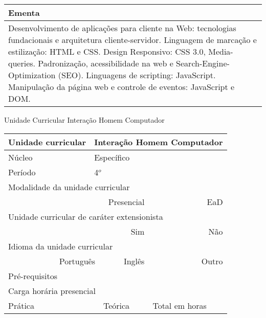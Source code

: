 \begin{quadro}[ht!]
\begin{tabular}{|p{3cm} p{2cm} p{3cm} p{2cm} p{3cm} p{2cm}|}
\multicolumn{6}{|p{15cm}|}{\cellcolor{blue1} Ementa} \\\hline
\hline\multicolumn{6}{|p{15cm}|}{\scriptsize Desenvolvimento de aplicações para cliente na Web: tecnologias fundacionais e arquitetura cliente-servidor. Linguagem de marcação e estilização: HTML e CSS. Design Responsivo: CSS 3.0, Media-queries. Padronização, acessibilidade na web e Search-Engine-Optimization (SEO). Linguagens de scripting: JavaScript. Manipulação da página web e controle de eventos: JavaScript e DOM.}\\\hline 
\hline
	\end{tabular}
\end{quadro}


\begin{quadro}[ht!]
  \centering\scriptsize
\caption{Unidade Curricular Interação Homem Computador}
\label{unit_21}
\begin{tabular}{|p{3cm} p{2cm} p{3cm} p{2cm} p{3cm} p{2cm}|}\hline
\multicolumn{1}{|p{3cm}|}{\cellcolor{blue1} Unidade curricular} & \multicolumn{5}{p{9cm}|}{Interação Homem Computador}\\\hline
\multicolumn{1}{|p{3cm}|}{\cellcolor{blue1} Núcleo} & \multicolumn{5}{p{11.5cm}|}{Específico}\\\hline
\multicolumn{1}{|p{3cm}|}{\cellcolor{blue1} Período} & \multicolumn{5}{p{9cm}|}{4$^o$}\\\hline
\multicolumn{6}{|p{15cm}|}{\cellcolor{blue1} Modalidade da unidade curricular} \\\hline
\multicolumn{2}{|r}{		} &  \multicolumn{2}{r}{Presencial \XBox} & \multicolumn{2}{r|}{EaD \Square	} \\\hline
\multicolumn{6}{|p{15cm}|}{\cellcolor{blue1} Unidade curricular de caráter extensionista} \\\hline
\multicolumn{4}{|r}{			Sim \Square	} & \multicolumn{2}{r|}{	Não \XBox	}\\\hline
\multicolumn{6}{|p{15cm}|}{\cellcolor{blue1} Idioma da unidade curricular} \\ \hline
\multicolumn{2}{|r}{	Português \XBox	} &  \multicolumn{2}{r}{	Inglês \Square	} & \multicolumn{2}{r|}{	Outro \Square	} \\ \hline
\multicolumn{1}{|p{3cm}|}{\cellcolor{blue1} Pré-requisitos} & \multicolumn{5}{p{9cm}|}{}\\ \hline
\multicolumn{6}{|p{15cm}|}{\cellcolor{blue1} Carga horária presencial} \\ \hline
\multicolumn{1}{|p{3cm}|}{\raggedleft Prática} & \multicolumn{1}{p{1cm}|}{\centering	15	} &  \multicolumn{1}{p{3cm}|}{\raggedleft Teórica}  & \multicolumn{1}{p{1cm}|}{\centering 	15	} & \multicolumn{1}{p{3cm}|}{\raggedleft Total em horas} & \multicolumn{1}{p{1cm}|}{\raggedleft	30	} \\ \hline 

\end{tabular}
\end{quadro}
